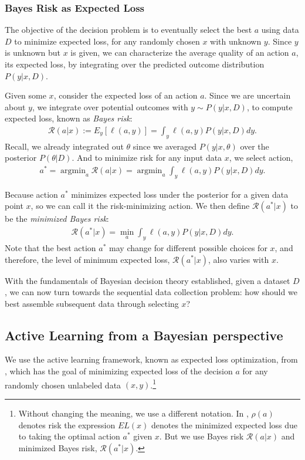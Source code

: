\documentclass[nonblindrev]{informs3}
\newcommand{\risk}{\mathcal{R}}
\begin{document}
\subsubsection{Bayes Risk as Expected Loss}

The objective of the decision problem is to eventually select the best $a$ using data $D$ to minimize expected loss, for any randomly chosen $x$ with unknown $y$. Since $y$ is unknown but $x$ is given, we can characterize the average quality of an action $a$, its expected loss, by integrating over the predicted outcome distribution $P(y|x,D)$. 

Given some $x$, consider the expected loss of an action $a$. Since we are uncertain about $y$, we integrate over potential outcomes with $y \sim P(y|x,D)$, to compute expected loss, known as \emph{Bayes risk}:
\begin{align}
\risk(a|x) := E_{y} \left[ \ell(a,y) \right] = \int_y \ell(a,y) P(y|x,D) dy .
\end{align}
Recall, we already integrated out $\theta$ since we averaged $P(y|x,\theta)$ over the posterior $P(\theta|D)$. And to minimize risk for any input data $x$, we select action,
\begin{align}
a^{*} = \mathop{\text{arg}\min}_a \risk(a|x) = \mathop{\text{arg}\min}_a \int_y \ell(a,y) P(y|x,D) dy.
\end{align}

Because action $a^{*}$ minimizes expected loss under the posterior for a given data point $x$, so we can call it the risk-minimizing action. We then define $\risk(a^{*}|x)$ to be the \emph{minimized Bayes risk}:
\begin{align}
\risk(a^{*}|x) = \min_a \int_y \ell(a,y) P(y|x,D) dy .
\end{align}
Note that the best action $a^{*}$ may change for different possible choices for $x$, and therefore, the level of minimum expected loss, $\risk(a^{*}|x)$, also varies with $x$.

With the fundamentals of Bayesian decision theory established, given a dataset $D$, we can now turn towards the sequential data collection problem: how should we best assemble subsequent data through selecting $x$? 


\subsection{Active Learning from a Bayesian perspective}

We use the active learning framework, known as expected loss optimization, from \cite{longchapelle2010active}, which has the goal of minimizing expected loss of the decision $a$ for any randomly chosen unlabeled data $(x,y)$.\footnote{Without changing the meaning, we use a different notation. In \cite{longchapelle2010active}, $\rho(a)$ denotes risk the expression $EL(x)$ denotes the minimized expected loss due to taking the optimal action $a^{*}$ given $x$. But we use Bayes risk $\risk(a|x)$ and minimized Bayes risk, $\risk(a^{*}|x)$.} 
\end{document}
